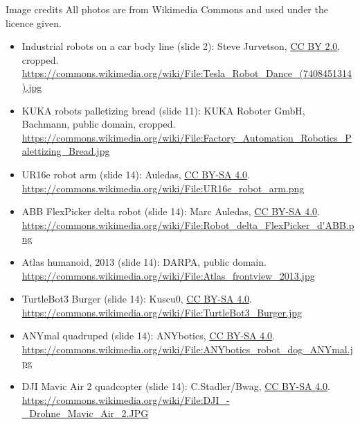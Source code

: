 \documentclass[aspectratio=169]{beamer}
\begin{document}
\begin{frame}{Image credits}
	\scriptsize All photos are from Wikimedia Commons and used under the licence given.
	\begin{itemize}\scriptsize
		\item Industrial robots on a car body line (slide 2): Steve Jurvetson, \href{https://creativecommons.org/licenses/by/2.0/}{CC BY 2.0}, cropped.\\ \url{https://commons.wikimedia.org/wiki/File:Tesla_Robot_Dance_(7408451314).jpg}
		\item KUKA robots palletizing bread (slide 11): KUKA Roboter GmbH, Bachmann, public domain, cropped.\\ \url{https://commons.wikimedia.org/wiki/File:Factory_Automation_Robotics_Palettizing_Bread.jpg}
		\item UR16e robot arm (slide 14): Auledas, \href{https://creativecommons.org/licenses/by-sa/4.0/}{CC BY-SA 4.0}.\\ \url{https://commons.wikimedia.org/wiki/File:UR16e_robot_arm.png}
		\item ABB FlexPicker delta robot (slide 14): Marc Auledas, \href{https://creativecommons.org/licenses/by-sa/4.0/}{CC BY-SA 4.0}.\\ \url{https://commons.wikimedia.org/wiki/File:Robot_delta_FlexPicker_d'ABB.png}
		\item Atlas humanoid, 2013 (slide 14): DARPA, public domain.\\ \url{https://commons.wikimedia.org/wiki/File:Atlas_frontview_2013.jpg}
		\item TurtleBot3 Burger (slide 14): Kuscu0, \href{https://creativecommons.org/licenses/by-sa/4.0/}{CC BY-SA 4.0}.\\ \url{https://commons.wikimedia.org/wiki/File:TurtleBot3_Burger.jpg}
		\item ANYmal quadruped (slide 14): ANYbotics, \href{https://creativecommons.org/licenses/by-sa/4.0/}{CC BY-SA 4.0}.\\ \url{https://commons.wikimedia.org/wiki/File:ANYbotics_robot_dog_ANYmal.jpg}
		\item DJI Mavic Air 2 quadcopter (slide 14): C.Stadler/Bwag, \href{https://creativecommons.org/licenses/by-sa/4.0/}{CC BY-SA 4.0}.\\ \url{https://commons.wikimedia.org/wiki/File:DJI_-_Drohne_Mavic_Air_2.JPG}
	\end{itemize}
\end{frame}
\end{document}

